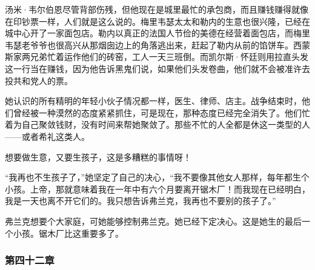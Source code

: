 \par 汤米·韦尔伯恩尽管背部伤残，但他现在是城里最忙的承包商，而且赚钱赚得就像在印钞票一样，人们就是这么说的。梅里韦瑟太太和勒内的生意也很兴隆，已经在城中心开了一家面包店。勒内以真正的法国人节俭的美德在经营着面包店，而梅里韦瑟老爷爷也很高兴从那烟囱边上的角落逃出来，赶起了勒内从前的馅饼车。西蒙斯家两兄弟忙着运作他们的砖窑，工人一天三班倒。而凯尔斯·怀廷则用拉直头发这一行当在赚钱，因为他告诉黑鬼们说，如果他们头发卷曲，他们就不会被准许去投共和党人的票。
\par 她认识的所有精明的年轻小伙子情况都一样，医生、律师、店主。战争结束时，他们曾经被一种漠然的态度紧紧抓住，可是现在，那种态度已经完全消失了。他们忙着为自己聚敛钱财，没有时间来帮她聚敛了。那些不忙的人全都是休这一类型的人——或者希礼这类人。
\par 想要做生意，又要生孩子，这是多糟糕的事情呀！
\par “我再也不生孩子了，”她坚定了自己的决心，“我不要像其他女人那样，每年都生个小孩。上帝，那就意味着我在一年中有六个月要离开锯木厂！而我现在已经明白，我是一天也离不开它们的。我只想告诉弗兰克，我再也不要别的孩子了。”
\par 弗兰克想要个大家庭，可她能够控制弗兰克。她已经下定决心。这是她生的最后一个小孩。锯木厂比这重要多了。

\subsubsection{第四十二章}

